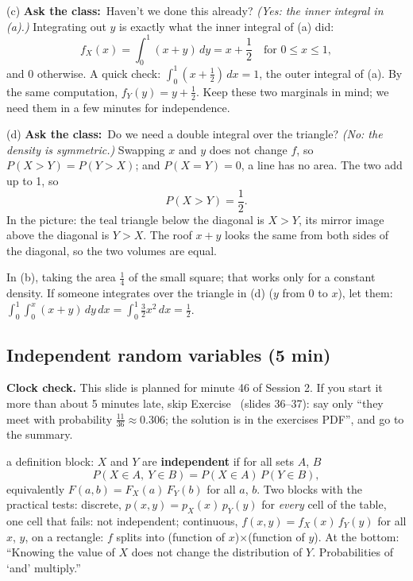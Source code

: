 \documentclass[11pt,a4paper,parskip=half]{scrartcl}
\renewcommand{\needspace}[1]{\Needspace{6\baselineskip}}
\newcommand{\ask}{\textbf{\color{navy}Ask the class:}\ }
\begin{document}
(c) \ask Haven't we done this already? \emph{(Yes: the inner integral in
(a).)} Integrating out $y$ is exactly what the inner integral of (a) did:
\[ f_X(x)=\int_0^1(x+y)\,dy=x+\frac12\quad\text{for }0\le x\le1, \]
and 0 otherwise. A quick check: $\int_0^1(x+\tfrac12)\,dx=1$, the outer
integral of (a). By the same computation, $f_Y(y)=y+\tfrac12$. Keep these
two marginals in mind; we need them in a few minutes for independence.

(d) \ask Do we need a double integral over the triangle? \emph{(No: the
density is symmetric.)} Swapping $x$ and $y$ does not change $f$, so
$P(X>Y)=P(Y>X)$; and $P(X=Y)=0$, a line has no area. The two add up to
1, so
\[ P(X>Y)=\frac12. \]
In the picture: the teal triangle below the diagonal is $X>Y$, its mirror
image above the diagonal is $Y>X$. The roof $x+y$ looks the same from both
sides of the diagonal, so the two volumes are equal.

\begin{mistake}
	In (b), taking the area $\tfrac14$ of the small square; that works only
	for a constant density. If someone integrates over the triangle in (d)
	($y$ from $0$ to $x$), let them: $\int_0^1\int_0^x(x+y)\,dy\,dx
	=\int_0^1\tfrac32x^2\,dx=\tfrac12$.
\end{mistake}

\needspace{0.4\textheight}
\subsection{Independent random variables (5 min)}

\begin{clockcheck}
	\textbf{Clock check.} This slide is planned for minute 46 of Session 2.
	If you start it more than about 5 minutes late, skip
	Exercise~ (slides 36--37): say only ``they meet
	with probability $\frac{11}{36}\approx0.306$; the solution is in the
	exercises PDF'', and go to the summary.
\end{clockcheck}

\begin{onslide}
	a definition block: $X$ and $Y$ are \textbf{independent} if for all sets
	$A$, $B$
	\[ P(X\in A,\ Y\in B)=P(X\in A)\,P(Y\in B), \]
	equivalently $F(a,b)=F_X(a)\,F_Y(b)$ for all $a$, $b$. Two blocks with the
	practical tests: discrete, $p(x,y)=p_X(x)\,p_Y(y)$ for \emph{every} cell of
	the table, one cell that fails: not independent; continuous,
	$f(x,y)=f_X(x)\,f_Y(y)$ for all $x$, $y$, on a rectangle: $f$ splits into
	(function of $x$)$\times$(function of $y$). At the bottom: ``Knowing the
	value of $X$ does not change the distribution of $Y$. Probabilities of
	`and' multiply.''
\end{onslide}
\end{document}
